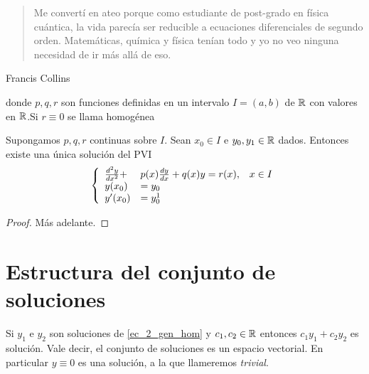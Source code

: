 \begin{quote}
Me convertí en ateo porque como estudiante de  post-grado en física cuántica, la vida parecía ser reducible a ecuaciones diferenciales de segundo orden. Matemáticas, 
química y física tenían todo y yo no veo ninguna necesidad de ir más allá de eso.
\end{quote}
\begin{flushright}
Francis Collins
\end{flushright}




\begin{definicion}
donde $p,q,r$ son funciones definidas en un intervalo $I=(a,b)$ de $\mathbb{R}$ con valores en $\mathbb{R}$.Si $r\equiv 0$ se llama homogénea
\end{definicion}







\begin{teorema}
Supongamos $p,q,r$ continuas sobre $I$. Sean $x_0\in I$ e $y_0,y_1\in\mathbb{R}$ dados. Entonces existe una única solución del PVI
\[\left\{
\begin{array}{l l l}
\frac{d^2y}{dx^2}+&p(x)\frac{dy}{dx}+q(x)y=r(x),&x\in I\\
y(x_0)&=y_0&\\
y'(x_0)&=y^1_0&\\
\end{array}\right.
\]
\end{teorema}
\begin{proof} Más adelante.

\end{proof}


\section{Estructura del conjunto de soluciones}
\begin{teorema}
Si $y_1$ e $y_2$ son soluciones de \eqref{ec_2_gen_hom} y $c_1,c_2\in\mathbb{R}$ entonces $c_1y_1+c_2y_2$ es solución. Vale decir, el conjunto de soluciones
es un espacio vectorial. En particular $y\equiv 0$ es una solución, a la que llameremos \emph{trivial}.
\end{teorema}

